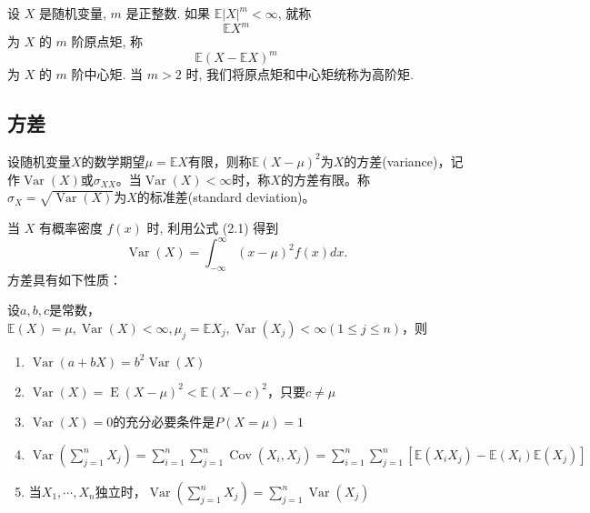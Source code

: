\begin{definition}[中心矩和原点矩]
    设 $X$ 是随机变量, $m$ 是正整数. 如果 $\mathbb{E}|X|^m<\infty$, 就称
    \[
        \mathbb{E}X^m
    \]
    为 $X$ 的 $m$ 阶原点矩, 称
    \[
        \mathbb{E}(X-\mathbb{E}X)^m
    \]
    为 $X$ 的 $m$ 阶中心矩. 当 $m>2$ 时, 我们将原点矩和中心矩统称为高阶矩.
\end{definition}

\subsection{方差}

\begin{definition}[方差]
    设随机变量$X$的数学期望$\mu=\mathbb{E}X$有限，则称$\mathbb{E}(X-\mu)^2$为$X$的方差(variance)，记作$\operatorname{Var}(X)$或$\sigma_{XX}$。当$\operatorname{Var}(X)<\infty$时，称$X$的方差有限。称$\sigma_X=\sqrt{\operatorname{Var}(X)}$为$X$的标准差(standard deviation)。
\end{definition}
当 $X$ 有概率密度 $f(x)$ 时, 利用公式 (2.1) 得到
$$
    \operatorname{Var}(X)=\int_{-\infty}^{\infty}(x-\mu)^2 f(x) d x .
$$
方差具有如下性质：

设$a,b,c$是常数，$\mathbb{E}(X)=\mu, \operatorname{Var}(X)<\infty,\mu_j=\mathbb{E}X_j,\operatorname{Var}(X_j)<\infty(1\le j\le n)$，则
\begin{enumerate}
    \item $\operatorname{Var}(a+bX)=b^2\operatorname{Var}(X)$
    \item $\operatorname{Var}(X)=\operatorname{E}(X-\mu)^2<\mathbb{E}(X-c)^2$，只要$c\ne \mu$
    \item $\operatorname{Var}(X)=0$的充分必要条件是$P(X=\mu)=1$
    \item $\operatorname{Var}(\sum_{j=1}^n X_j)=\sum_{i=1}^n \sum_{j=1}^n \operatorname{Cov}(X_i,X_j)=\sum_{i=1}^n \sum_{j=1}^n [\mathbb{E}(X_iX_j)-\mathbb{E}(X_i)\mathbb{E}(X_j)]$
    \item 当$X_1,\cdots,X_n$独立时，$\operatorname{Var}(\sum_{j=1}^n X_j)=\sum_{j=1}^n \operatorname{Var}(X_j)$
\end{enumerate}

